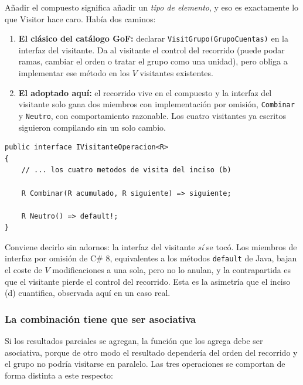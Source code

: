 Añadir el compuesto significa añadir un \emph{tipo de elemento}, y eso es exactamente lo que
Visitor hace caro. Había dos caminos:

\begin{enumerate}[leftmargin=1.2cm]
    \item \textbf{El clásico del catálogo GoF:} declarar \texttt{VisitGrupo(GrupoCuentas)} en
          la interfaz del visitante. Da al visitante el control del recorrido (puede podar
          ramas, cambiar el orden o tratar el grupo como una unidad), pero obliga a
          implementar ese método en los $V$ visitantes existentes.
    \item \textbf{El adoptado aquí:} el recorrido vive en el compuesto y la interfaz del
          visitante solo gana dos miembros con implementación por omisión, \texttt{Combinar} y
          \texttt{Neutro}, con comportamiento razonable. Los cuatro visitantes ya
          escritos siguieron compilando sin un solo cambio.
\end{enumerate}

{\small
\begin{verbatim}
public interface IVisitanteOperacion<R>
{
    // ... los cuatro metodos de visita del inciso (b)

    R Combinar(R acumulado, R siguiente) => siguiente;

    R Neutro() => default!;
}
\end{verbatim}
}

Conviene decirlo sin adornos: la interfaz del visitante \emph{sí} se tocó. Los miembros de
interfaz por omisión de C\# 8, equivalentes a los métodos \texttt{default} de Java, bajan el
coste de $V$ modificaciones a una sola, pero no lo anulan, y
la contrapartida es que el visitante pierde el control del recorrido. Esta es la asimetría que
el inciso (d) cuantifica, observada aquí en un caso real.

\subsubsection*{La combinación tiene que ser asociativa}

Si los resultados parciales se agregan, la función que los agrega debe ser asociativa, porque
de otro modo el resultado dependería del orden del recorrido y el grupo no podría visitarse en
paralelo. Las tres operaciones se comportan de forma distinta a este respecto:

